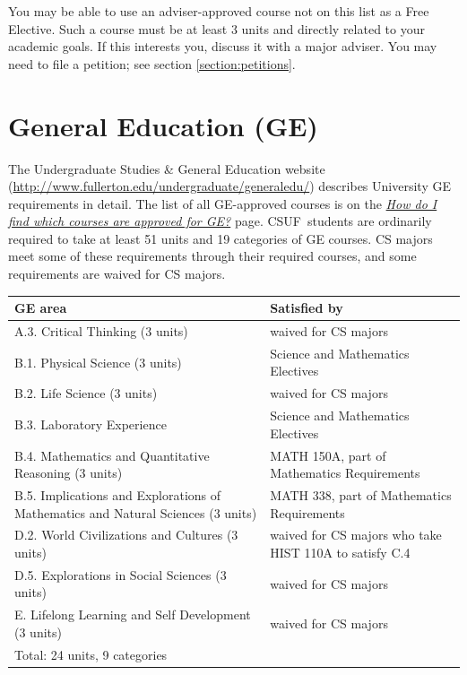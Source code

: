 \documentclass{book}
\newcommand{\campusname}{CSUF}
\begin{document}
You may be able to use an adviser-approved course not on this list as a Free Elective. Such a course must be at least 3 units and directly related to your academic goals. If this interests you, discuss it with a major adviser. You may need to file a petition; see section \ref{section:petitions}.

\section{General Education (GE)}

\newcommand{\gecourselist}{ \href{http://www.fullerton.edu/undergraduate/generaledu/ge_approvedcourses.asp}{\emph{How do I find which courses are approved for GE?}} }

The Undergraduate Studies \& General Education website (\url{http://www.fullerton.edu/undergraduate/generaledu/}) describes University GE requirements in detail. The list of all GE-approved courses is on the \gecourselist page. \campusname~students are ordinarily required to take at least 51 units and 19 categories of GE courses. CS majors meet some of these requirements through their required courses, and some requirements are waived for CS majors.

\begin{center}
\begin{tabular}{| p{3in} | p{3in} |} \hline
  \textbf{GE area} & \textbf{Satisfied by} \\ \hline
  A.3. Critical Thinking (3 units) & waived for CS majors \\ \hline
  B.1. Physical Science (3 units) & Science and Mathematics Electives \\ \hline
  B.2. Life Science (3 units) & waived for CS majors \\ \hline
  B.3. Laboratory Experience & Science and Mathematics Electives \\ \hline
  B.4. Mathematics and Quantitative Reasoning (3 units) & MATH 150A, part of Mathematics Requirements \\ \hline
  B.5. Implications and Explorations of Mathematics and Natural Sciences (3 units) & MATH 338, part of Mathematics Requirements \\ \hline
  D.2. World Civilizations and Cultures (3 units) & waived for CS majors who take HIST 110A to satisfy C.4 \\ \hline
  D.5. Explorations in Social Sciences (3 units) & waived for CS majors \\ \hline
  E. Lifelong Learning and Self Development (3 units) & waived for CS majors \\ \hline
  \multicolumn{2}{|l|}{Total: 24 units, 9 categories} \\ \hline
\end{tabular}
\end{center}
\end{document}

